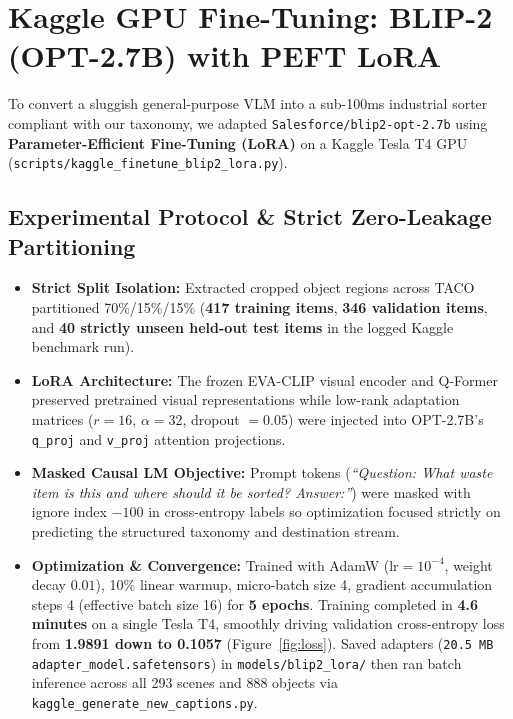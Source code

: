 \documentclass[11pt,a4paper]{article}
\begin{document}
\section{Kaggle GPU Fine-Tuning: BLIP-2 (OPT-2.7B) with PEFT LoRA}

To convert a sluggish general-purpose VLM into a sub-100ms industrial sorter compliant with our taxonomy, we adapted \texttt{Salesforce/blip2-opt-2.7b} using \textbf{Parameter-Efficient Fine-Tuning (LoRA)} on a Kaggle Tesla T4 GPU (\texttt{scripts/kaggle\_finetune\_blip2\_lora.py}).

\subsection{Experimental Protocol \& Strict Zero-Leakage Partitioning}
\begin{itemize}[leftmargin=1.5em]
    \item \textbf{Strict Split Isolation:} Extracted cropped object regions across TACO partitioned 70\%/15\%/15\% (\textbf{417 training items}, \textbf{346 validation items}, and \textbf{40 strictly unseen held-out test items} in the logged Kaggle benchmark run).
    \item \textbf{LoRA Architecture:} The frozen EVA-CLIP visual encoder and Q-Former preserved pretrained visual representations while low-rank adaptation matrices ($r = 16$, $\alpha = 32$, dropout $= 0.05$) were injected into OPT-2.7B's \texttt{q\_proj} and \texttt{v\_proj} attention projections.
    \item \textbf{Masked Causal LM Objective:} Prompt tokens (\textit{``Question: What waste item is this and where should it be sorted? Answer:''}) were masked with ignore index $-100$ in cross-entropy labels so optimization focused strictly on predicting the structured taxonomy and destination stream.
    \item \textbf{Optimization \& Convergence:} Trained with AdamW ($\text{lr} = 10^{-4}$, weight decay $0.01$), 10\% linear warmup, micro-batch size 4, gradient accumulation steps 4 (effective batch size 16) for \textbf{5 epochs}. Training completed in \textbf{4.6 minutes} on a single Tesla T4, smoothly driving validation cross-entropy loss from \textbf{1.9891 down to 0.1057} (Figure~\ref{fig:loss}). Saved adapters (\texttt{20.5 MB} \texttt{adapter\_model.safetensors}) in \texttt{models/blip2\_lora/} then ran batch inference across all 293 scenes and 888 objects via \texttt{kaggle\_generate\_new\_captions.py}.
\end{itemize}
\end{document}

